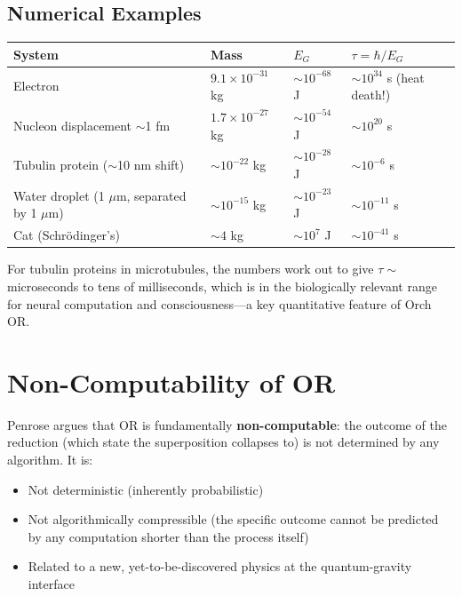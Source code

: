 \documentclass[11pt,a4paper]{report}
\begin{document}
\subsection{Numerical Examples}

\begin{center}
\renewcommand{\arraystretch}{1.3}
\begin{tabular}{>{\raggedright}p{4cm} >{\raggedright}p{3cm} >{\raggedright}p{3cm} >{\raggedright\arraybackslash}p{3cm}}
  \toprule
  \textbf{System} & \textbf{Mass} & $E_G$ & $\tau = \hbar/E_G$ \\
  \midrule
  Electron & $9.1 \times 10^{-31}$ kg & $\sim 10^{-68}$ J & $\sim 10^{34}$ s (heat death!) \\
  Nucleon displacement $\sim$1 fm & $1.7 \times 10^{-27}$ kg & $\sim 10^{-54}$ J & $\sim 10^{20}$ s \\
  Tubulin protein ($\sim$10 nm shift) & $\sim 10^{-22}$ kg & $\sim 10^{-28}$ J & $\sim 10^{-6}$ s \\
  Water droplet (1 $\mu$m, separated by 1 $\mu$m) & $\sim 10^{-15}$ kg & $\sim 10^{-23}$ J & $\sim 10^{-11}$ s \\
  Cat (Schr\"odinger's) & $\sim 4$ kg & $\sim 10^{7}$ J & $\sim 10^{-41}$ s \\
  \bottomrule
\end{tabular}
\end{center}

For tubulin proteins in microtubules, the numbers work out to give $\tau \sim$ microseconds to tens of milliseconds, which is in the biologically relevant range for neural computation and consciousness---a key quantitative feature of Orch OR.

\section{Non-Computability of OR}

Penrose argues that OR is fundamentally \textbf{non-computable}: the outcome of the reduction (which state the superposition collapses to) is not determined by any algorithm. It is:
\begin{itemize}[leftmargin=1.5em]
  \item Not deterministic (inherently probabilistic)
  \item Not algorithmically compressible (the specific outcome cannot be predicted by any computation shorter than the process itself)
  \item Related to a new, yet-to-be-discovered physics at the quantum-gravity interface
\end{itemize}
\end{document}
